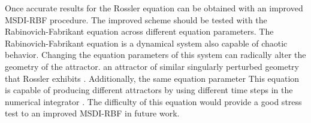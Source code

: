             Once accurate results for the Rossler equation can be obtained with an improved MSDI-RBF procedure. The improved
            scheme should be tested with the Rabinovich-Fabrikant equation across different equation parameters. The
            Rabinovich-Fabrikant equation is a dynamical system also capable of chaotic behavior. Changing the equation
            parameters of this system can radically alter the geometry of the attractor.
            an attractor of similar singularly perturbed geometry that Rossler exhibits \cite{item:8}. Additionally, the same equation parameter
            This equation is capable of producing different attractors by using different time steps in the numerical integrator \cite{item:22}.
            The difficulty of this equation would provide a good stress test to an improved MSDI-RBF in future work.\\

